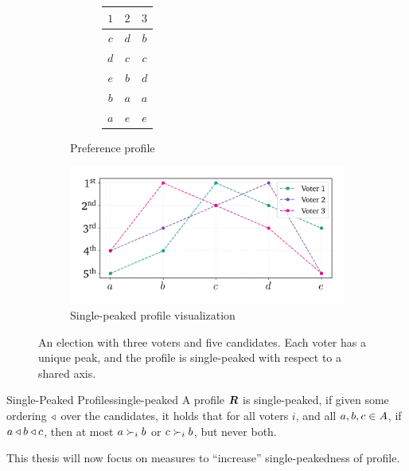 \begin{figure}[ht]
	\centering
	\begin{subfigure}[b]{0.3\textwidth}
		\centering
		\begin{subfigure}[b]{0.3\textwidth}
			\centering
			\begin{tabular}{ccc}
				\toprule
				$1$ & $2$ & $3$ \\
				\midrule
				$c$ & $d$ & $b$ \\
				$d$ & $c$ & $c$ \\
				$e$ & $b$ & $d$ \\
				$b$ & $a$ & $a$ \\
				$a$ & $e$ & $e$ \\
				\bottomrule
			\end{tabular}
			\vspace{2.8em}
		\end{subfigure}
		\caption{Preference profile}\label{tab:corresponding_profile}
	\end{subfigure}
	\hfill
	\begin{subfigure}[b]{0.65\textwidth}
		\centering
		\includegraphics[width=\textwidth]{Figures/single_peak_vis.png}
		\caption{Single-peaked profile visualization}\label{fig:singlepeaked_vis}
	\end{subfigure}
	\caption{An election with three voters and five candidates. Each voter has a unique peak, and the profile is single-peaked with respect to a shared axis.}
	\label{fig:singlepeaked_full}
\end{figure}
\begin{definition}{Single-Peaked Profiles}{single-peaked}
	A profile $\boldsymbol{R}$ is single-peaked, if given some ordering
	$\triangleleft$ over the candidates, it holds that for all voters $i$, and
	all $a, b, c \in A$, if $a \triangleleft b \triangleleft c$, then
	at most $a \succ_i b$ or $c \succ_i b$, but never both.
\end{definition}

This thesis will now focus on measures to ``increase'' single-peakedness of profile.



